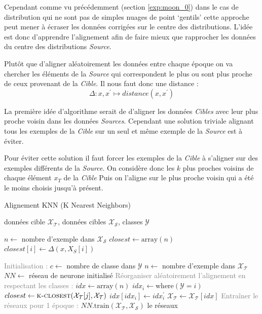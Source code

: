 Cependant comme vu précédemment (section \ref{exp:moon_0}) dans le cas de
distribution qui ne sont pas de simples nuages de point `gentils' cette approche 
peut mener à écraser les données corrigées sur le centre des distributions.
L'idée est donc d'apprendre l'alignement afin de faire mieux que rapprocher les
données du centre des distributions \emph{Source}.

Plutôt que d'aligner aléatoirement les données entre chaque époque on va chercher
les éléments de la \emph{Source} qui correspondent le plus ou sont plus proche de 
ceux provenant de la \emph{Cible}. Il nous faut donc une distance : 
$$ \Delta : x, x^\prime \mapsto distance(x, x^\prime)$$

La première idée d'algorithme serait de d'aligner les données \emph{Cibles} avec leur
plus proche voisin dans les données \emph{Sources}. Cependant une solution triviale
alignant tous les exemples de la \emph{Cible} sur un seul et même exemple de la 
\emph{Source} est à éviter.

Pour éviter cette solution il faut forcer les exemples de la \emph{Cible} à s'aligner 
sur des exemples différents de la \emph{Source}.
On considère donc les $k$ plus proches voisins de chaque élément $x_T$ de la \emph{Cible}
Puis on l'aligne sur le plus proche voisin qui a été le moins choisis jusqu'à présent.


\begin{algorithm}[tb]
   \caption{Alignement KNN (K Nearest Neighbors)}
   \label{alg:align_KNN}
\begin{algorithmic}
     données cible $\mathcal{X_T}$, données cibles $\mathcal{X_S}$, classes $\mathcal{Y}$
    
    \State $n \gets $ nombre d'exemple dans $\mathcal{X_S}$
    \State $closest \gets \text{array}(n)$
        \State $closest[i] \gets \Delta(x, X_S[i])$
    \EndFor           
    \EndFunction

    \State \textcolor{gray}{Initialisation :}
    \State $c \gets $ nombre de classe dans $\mathcal{Y}$
    \State $n \gets $ nombre d'exemple dans $\mathcal{X_T}$
    \State $NN \gets$ réseau de neurone initialisé
        \State \textcolor{gray}{Réorganiser aléatoirement l'alignement en respectant les classes :}
        \State $idx \gets \text{array}(n)$
            \State $idx_i \gets \text{where}(\mathcal{Y}=i)$
                \State $closest \gets \textsc{k-closest}(\mathcal{X_T}[j], \mathcal{X_T})$
            \EndFor
            \State $idx[idx_i]\gets idx_i^\prime$
        \EndFor
        \State $\mathcal{X_T} \gets \mathcal{X_T}[idx]$
        \State \textcolor{gray}{Entraîner le réseaux pour 1 époque :}
        \State $NN.\text{train}(\mathcal{X_T}, \mathcal{X_S})$
    \EndWhile
     le réseaux
\end{algorithmic}
\end{algorithm}


